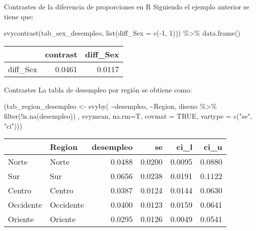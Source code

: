 \documentclass[
  ignorenonframetext,
]{beamer}
\newenvironment{Shaded}{\begin{snugshade}}{\end{snugshade}}
\newcommand{\AttributeTok}[1]{\textcolor[rgb]{0.77,0.63,0.00}{#1}}
\newcommand{\ConstantTok}[1]{\textcolor[rgb]{0.00,0.00,0.00}{#1}}
\newcommand{\DecValTok}[1]{\textcolor[rgb]{0.00,0.00,0.81}{#1}}
\newcommand{\FunctionTok}[1]{\textcolor[rgb]{0.00,0.00,0.00}{#1}}
\newcommand{\NormalTok}[1]{#1}
\newcommand{\OtherTok}[1]{\textcolor[rgb]{0.56,0.35,0.01}{#1}}
\newcommand{\SpecialCharTok}[1]{\textcolor[rgb]{0.00,0.00,0.00}{#1}}
\newcommand{\StringTok}[1]{\textcolor[rgb]{0.31,0.60,0.02}{#1}}
\begin{document}
\begin{frame}[fragile]{Contrastes de la diferencia de proporciones en R}
\protect\hypertarget{contrastes-de-la-diferencia-de-proporciones-en-r-1}{}
Siguiendo el ejemplo anterior se tiene que:

\begin{Shaded}
\begin{Highlighting}[]
\FunctionTok{svycontrast}\NormalTok{(tab\_sex\_desempleo,}
            \FunctionTok{list}\NormalTok{(}\AttributeTok{diff\_Sex =} \FunctionTok{c}\NormalTok{(}\SpecialCharTok{{-}}\DecValTok{1}\NormalTok{, }\DecValTok{1}\NormalTok{))) }\SpecialCharTok{\%\textgreater{}\%}
  \FunctionTok{data.frame}\NormalTok{()}
\end{Highlighting}
\end{Shaded}

\begin{tabular}{l|r|r}
\hline
  & contrast & diff\_Sex\\
\hline
diff\_Sex & 0.0461 & 0.0117\\
\hline
\end{tabular}
\end{frame}

\begin{frame}[fragile]{Contrastes}
\protect\hypertarget{contrastes-1}{}
La tabla de desempleo por región se obtiene como:

\begin{Shaded}
\begin{Highlighting}[]
\NormalTok{(tab\_region\_desempleo }\OtherTok{\textless{}{-}} \FunctionTok{svyby}\NormalTok{(}
  \SpecialCharTok{\textasciitilde{}}\NormalTok{desempleo, }\SpecialCharTok{\textasciitilde{}}\NormalTok{Region, }
\NormalTok{    diseno }\SpecialCharTok{\%\textgreater{}\%} \FunctionTok{filter}\NormalTok{(}\SpecialCharTok{!}\FunctionTok{is.na}\NormalTok{(desempleo)) , }
\NormalTok{    svymean, }\AttributeTok{na.rm=}\NormalTok{T, }\AttributeTok{covmat =} \ConstantTok{TRUE}\NormalTok{,}
     \AttributeTok{vartype =} \FunctionTok{c}\NormalTok{(}\StringTok{"se"}\NormalTok{, }\StringTok{"ci"}\NormalTok{)))}
\end{Highlighting}
\end{Shaded}

\begin{tabular}{l|l|r|r|r|r}
\hline
  & Region & desempleo & se & ci\_l & ci\_u\\
\hline
Norte & Norte & 0.0488 & 0.0200 & 0.0095 & 0.0880\\
\hline
Sur & Sur & 0.0656 & 0.0238 & 0.0191 & 0.1122\\
\hline
Centro & Centro & 0.0387 & 0.0124 & 0.0144 & 0.0630\\
\hline
Occidente & Occidente & 0.0400 & 0.0123 & 0.0159 & 0.0641\\
\hline
Oriente & Oriente & 0.0295 & 0.0126 & 0.0049 & 0.0541\\
\hline
\end{tabular}
\end{frame}
\end{document}
